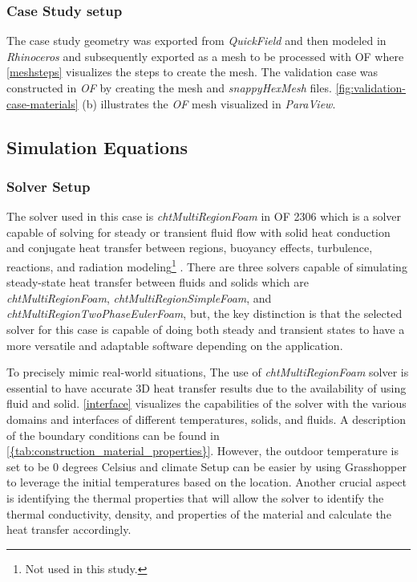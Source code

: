 \subsubsection{Case Study setup}
The case study geometry was exported from \textit{QuickField} and then modeled in \textit{Rhinoceros} and subsequently exported as a mesh to be processed with  \gls{OF} where \ref{meshsteps} visualizes the steps to create the mesh. 
The validation case was constructed in \textit{ \gls{OF}} by creating the mesh and \textit{snappyHexMesh} files.  
\ref{fig:validation-case-materials}  (b) illustrates the \textit{\gls{OF}} mesh visualized in \textit{ParaView}.
    



\subsection{Simulation Equations}

\subsubsection{Solver Setup}
The solver used in this case is \textit{chtMultiRegionFoam} in  \gls{OF} 2306 which is a solver capable of solving for steady or transient fluid flow with solid heat conduction and conjugate heat transfer between regions, buoyancy effects, turbulence, reactions, and radiation modeling\footnote{Not used in this study.} \cite{cht}.
There are three solvers capable of simulating steady-state heat transfer between fluids and solids which are \textit{chtMultiRegionFoam}, \textit{chtMultiRegionSimpleFoam}, and \textit{chtMultiRegionTwoPhaseEulerFoam}, but, the key distinction is that the selected solver for this case is capable of doing both steady and transient states to have a more versatile and adaptable software depending on the application. 


To precisely mimic real-world situations, The use of \textit{chtMultiRegionFoam} solver is essential to have accurate 3D heat transfer results due to the availability of using fluid and solid. \ref{interface} visualizes the capabilities of the solver with the various domains and interfaces of different temperatures, solids, and fluids. 
A description of the boundary conditions can be found in \cref{{tab:construction_material_properties}}. 
However, the outdoor temperature is set to be 0 degrees Celsius and climate Setup can be easier by using Grasshopper to leverage the initial temperatures based on the location. 
Another crucial aspect is identifying the thermal properties that will allow the solver to identify the thermal conductivity, density, and properties of the material and calculate the heat transfer accordingly.

